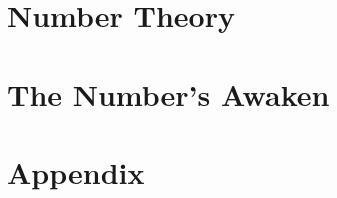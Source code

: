 \documentclass{maaprb}
\theoremstyle{definition}
\theoremstyle{remark}
\numberwithin{section}{chapter}
\numberwithin{equation}{chapter}
\begin{document}
\part{Number Theory}





\part{The Number's Awaken}



\backmatter

\appendix
\part{Appendix}



\clearpage
\end{document}

